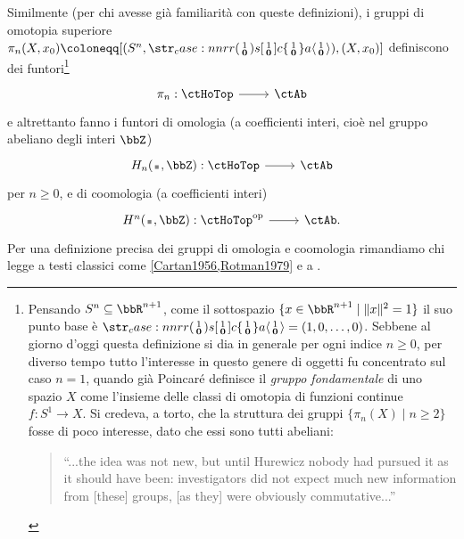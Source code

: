 \begin{example}
	Similmente (per chi avesse già familiarità con queste definizioni), i gruppi di omotopia superiore \(\pi_n(X,x_0) \defeq [(S^n,\copmap[r] 1{\mathbf{0}}), (X,x_0)]\) definiscono dei funtori\footnote{Pensando \(S^n\subseteq\bbR^{n+1}\), come il sottospazio \(\{x\in\bbR^{n+1}\mid \|x\|^2=1\}\) il suo punto base è \(\copmap[r]1{\mathbf 0}=(1,0,\dots,0)\). Sebbene al giorno d'oggi questa definizione si dia in generale per ogni indice \(n\ge 0\), per diverso tempo tutto l'interesse in questo genere di oggetti fu concentrato sul caso \(n=1\), quando già Poincaré definisce il \emph{gruppo fondamentale} di uno spazio \(X\) come l'insieme delle classi di omotopia di funzioni continue \(f : S^1 \to X\). Si credeva, a torto, che la struttura dei gruppi \(\{\pi_n(X)\mid n\ge 2\}\) fosse di poco interesse, dato che essi sono tutti abeliani:
	\begin{quote}
		``...the idea was not new, but until Hurewicz nobody had pursued it as it should have been: investigators did not expect much new information from  [these] groups, [as they] were obviously commutative...''
	\end{quote}}
	\[\dmFun{\pi_n}\ctHoTop\ctAb\]
	e altrettanto fanno i funtori di omologia (a coefficienti interi, cioè nel gruppo abeliano degli interi \(\bbZ\))
	\[\dmFun{H_n(\blank,\bbZ)}\ctHoTop\ctAb\]
	per \(n\ge 0\), e di coomologia (a coefficienti interi)
	\[\dmFun{H^n(\blank,\bbZ)}{\ctHoTop^\op}{\ctAb.}\]
	Per una definizione precisa dei gruppi di omologia e coomologia rimandiamo chi legge a testi classici come \ref{Cartan1956,Rotman1979} e a \cite[pp. 5--6]{Vick73a}.
\end{example}
